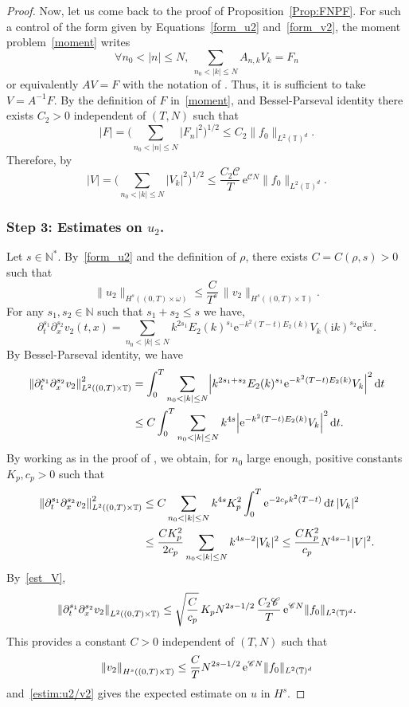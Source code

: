 \documentclass[JEP,XML,SOM,Unicode,NoEqCountersInSection]{cedram}
\let\mathcal\mathscr
\theoremstyle{plain}
\theoremstyle{definition}
\theoremstyle{remark}
\newcommand{\diff}[1][-3]{\ensuremath{\mathop{}\mkern#1mu\mathrm{d}}}
\newcommand{\set}{\mathbb}
\newcommand{\N}{\set{N}}
\newcommand{\T}{\set{T}}
\newcommand{\eu}{\mathrm e}
\newcommand{\iu}{\mathrm i}
\let\originalleft\left
\let\originalright\right
\renewcommand{\left}{\mathopen{}\mathclose\bgroup\originalleft}
\renewcommand{\right}{\aftergroup\egroup\originalright}
\begin{document}
\begin{proof}
Now, let us come back to the proof of Proposition~\ref{Prop:FNPF}.
For such a control of the form given by Equations~\eqref{form_u2} and~\eqref{form_v2}, the moment problem~\eqref{moment} writes
\[
\forall n_0 < |n|\leq N, \
\sum_{n_0 < |k|\leq N} A_{n,k} V_k = F_n
\]
or equivalently $AV=F$ with the notation of .
Thus, it is sufficient to take $V=A^{-1}F$.
By the definition of $F$ in~\eqref{moment}, and Bessel-Parseval identity there exists $C_2>0$ independent of $(T,N)$ such that
\[
|F| = \biggl(\sum_{n_0<|n|\leq N} |F_n|^2 \biggr)^{1/2} \leq C_2 \|f_0\|_{L^2(\T)^d}.
\]
Therefore, by 
\begin{equation}\label{est_V}
|V| = \biggl(\sum_{n_0<|k|\leq N} |V_k|^2 \biggr)^{1/2} \leq \frac{C_2 \mathcal{C} }{T}\, \eu^{\mathcal{C}N} \|f_0 \|_{L^2(\T)^d}.
\end{equation}

\subsubsection*{Step 3: Estimates on $u_2$.} Let $s\in\N^*$. By~\eqref{form_u2} and the definition of $\rho$,
there exists $C=C(\rho,s)>0$ such that
\begin{equation} \label{estim:u2/v2}
\| u_2 \|_{H^s((0,T)\times\omega)} \leq \frac{C}{T^s}\, \|v_2\|_{H^s((0,T)\times\T)}.
\end{equation}
For any $s_1, s_2 \in \N$ such that $s_1+s_2 \leq s$ we have,
\[
\partial_t^{s_1} \partial_x^{s_2} v_2 (t,x) =
\sum_{n_0<|k|\leq N} k^{2s_1} E_2(k)^{s_1} \eu^{-k^2(T-t)E_2(k)} V_k (\iu k)^{s_2} \eu^{\iu kx}.
\]
By Bessel-Parseval identity, we have
\begin{align*}
\left\| \partial_t^{s_1} \partial_x^{s_2} v_2 \right\|_{L^2((0,T)\times\T)}^2
& = \int_0^T \sum_{n_0<|k|\leq N} \left| k^{2s_1+s_2} E_2(k)^{s_1} \eu^{-k^2(T-t)E_2(k)} V_k \right|^2 \diff t\\
& \leq C \int_0^T \sum_{n_0<|k|\leq N} k^{4s} \left| \eu^{-k^2(T-t)E_2(k)} V_k\right|^2 \diff t.
\end{align*}
By working as in the proof of , we obtain, for $n_0$ large enough, positive constants $K_p, c_p>0$ such that
\begin{align*}
\left\| \partial_t^{s_1} \partial_x^{s_2} v_2 \right\|_{L^2((0,T)\times\T)}^2
& \leq C \sum_{n_0<|k|\leq N} k^{4s} K_p^2 \int_0^T \eu^{-2c_pk^2(T-t)} \diff t\, |V_k|^2 \\
& \leq \frac{C K_p^2}{2c_p} \sum_{n_0<|k|\leq N} k^{4s-2} |V_k|^2 \leq \frac{C K_p^2}{c_p} N^{4s-1} |V|^2.
\end{align*}
By~\eqref{est_V},
\[
\left\|\partial_t^{s_1} \partial_x^{s_2} v_2 \right\|_{L^2((0,T)\times\T)}
\leq \sqrt{\frac{C}{c_p}}\, K_p N^{2s-1/2}\, \frac{C_2 \mathcal{C} }{T}\, \eu^{\mathcal{C}N} \|f_0 \|_{L^2(\T)^d}.
\]
This provides a constant $C>0$ independent of $(T,N)$ such that
\[
\left\| v_2 \right\|_{H^s((0,T)\times\T)}
\leq \frac{C}{T} N^{2s-1/2}\, \eu^{\mathcal{C}N} \|f_0 \|_{L^2(\T)^d}
\]
and~\eqref{estim:u2/v2} gives the expected estimate on $u$ in $H^s$.
\end{proof}
\end{document}
